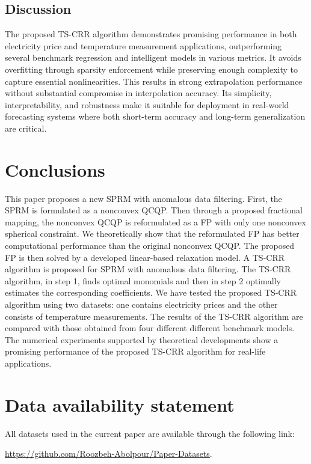 \documentclass[smallextended,referee,envcountsect,,numbers]{svjour3}
\begin{document}
\subsection{Discussion}
The proposed TS-CRR algorithm demonstrates promising performance in both electricity price and temperature measurement applications, outperforming several benchmark regression and intelligent models in various metrics.
It avoids overfitting through sparsity enforcement while preserving enough complexity to capture essential nonlinearities. This results in strong extrapolation performance without substantial compromise in interpolation accuracy. Its simplicity, interpretability, and robustness make it suitable for deployment in real-world forecasting systems where both short-term accuracy and long-term generalization are critical.


\section{Conclusions} \label{sec:cnc}
This paper proposes a new SPRM with anomalous data filtering. First, the SPRM is formulated as a nonconvex QCQP. Then through a proposed fractional mapping, the nonconvex QCQP is reformulated as a FP with only one nonconvex spherical constraint. We theoretically show that the reformulated FP has better computational performance than the original nonconvex QCQP. The proposed FP is then solved by a developed linear-based relaxation model. A TS-CRR algorithm is proposed for SPRM with anomalous data filtering. The TS-CRR algorithm, in step 1, finds optimal monomials and then in step 2 optimally estimates the corresponding coefficients. We have tested the proposed TS-CRR algorithm using two datasets: one contains electricity prices and the other consists of temperature measurements. The results of the TS-CRR algorithm are compared with those obtained from four different different benchmark models. The numerical experiments supported by theoretical developments show a promising performance of the proposed TS-CRR algorithm for real-life applications. 

\section{Data availability statement}
All datasets used in the current paper are available through the following link: 

\url{https://github.com/Roozbeh-Abolpour/Paper-Datasets}.
\end{document}
